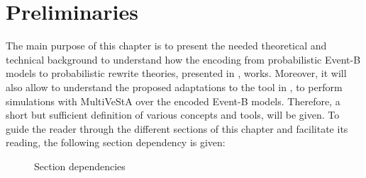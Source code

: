\chapter{Preliminaries}
The main purpose of this chapter is to present the needed theoretical and technical background to understand how the encoding from probabilistic Event-B models to probabilistic rewrite theories, presented in \cite{Olarte}, works. Moreover, it will also allow to understand the proposed adaptations to the tool in \cite{tool.website}, to perform simulations with MultiVeStA over the encoded Event-B models. Therefore, a short but sufficient definition of various concepts and tools, will be given. To guide the reader through the different sections of this chapter and facilitate its reading, the following section dependency is given:

\begin{figure}[H]
    \centering
    \caption{Section dependencies}
    \label{fig:sectionDependency}
\end{figure}

